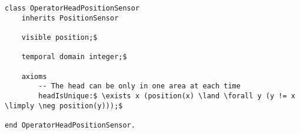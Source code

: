 \begin{lstlisting}[fontadjust, mathescape, frame=tlb] 
class OperatorHeadPositionSensor
    inherits PositionSensor
    
    visible position;$

    temporal domain integer;$

    axioms
        -- The head can be only in one area at each time
        headIsUnique:$ \exists x (position(x) \land \forall y (y != x \limply \neg position(y)));$

end OperatorHeadPositionSensor.\end{lstlisting}